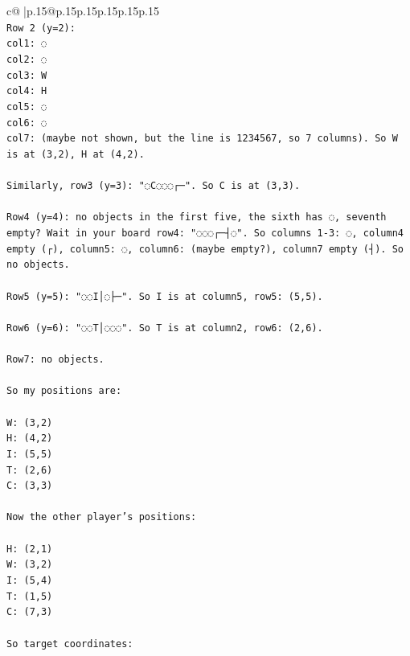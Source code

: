 \documentclass{article}
\begin{document}
{\begin{supertabular}{c@{$\;$}|p{.15\linewidth}@{}p{.15\linewidth}p{.15\linewidth}p{.15\linewidth}p{.15\linewidth}p{.15\linewidth}}
{{{\\ 
\texttt{Row 2 (y=2):} \\
\texttt{col1: ◌} \\
\texttt{col2: ◌} \\
\texttt{col3: W} \\
\texttt{col4: H} \\
\texttt{col5: ◌} \\
\texttt{col6: ◌} \\
\texttt{col7: (maybe not shown, but the line is 1234567, so 7 columns). So W is at (3,2), H at (4,2).} \\
\\ 
\texttt{Similarly, row3 (y=3): "◌C◌◌◌┌─". So C is at (3,3).} \\
\\ 
\texttt{Row4 (y=4): no objects in the first five, the sixth has ◌, seventh empty? Wait in your board row4: "◌◌◌┌─┤◌". So columns 1{-}3: ◌, column4 empty (┌), column5: ◌, column6: (maybe empty?), column7 empty (┤). So no objects.} \\
\\ 
\texttt{Row5 (y=5): "◌◌I│◌├─". So I is at column5, row5: (5,5).} \\
\\ 
\texttt{Row6 (y=6): "◌◌T│◌◌◌". So T is at column2, row6: (2,6).} \\
\\ 
\texttt{Row7: no objects.} \\
\\ 
\texttt{So my positions are:} \\
\\ 
\texttt{W: (3,2)} \\
\texttt{H: (4,2)} \\
\texttt{I: (5,5)} \\
\texttt{T: (2,6)} \\
\texttt{C: (3,3)} \\
\\ 
\texttt{Now the other player's positions:} \\
\\ 
\texttt{H: (2,1)} \\
\texttt{W: (3,2)} \\
\texttt{I: (5,4)} \\
\texttt{T: (1,5)} \\
\texttt{C: (7,3)} \\
\\ 
\texttt{So target coordinates:} \\
\\ 
}}}
\end{supertabular}}
\end{document}

